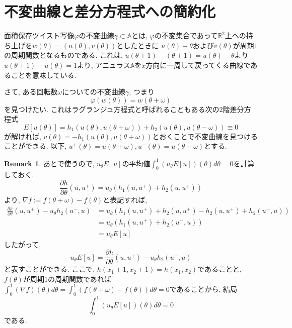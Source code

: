 \documentclass[a4paper]{ujarticle}
\numberwithin{equation}{section}
\theoremstyle{definition}
\newtheorem{remark}{Remark}
\begin{document}
    \section{不変曲線と差分方程式への簡約化}
        面積保存ツイスト写像$\varphi$の不変曲線$\gamma \subset \mathbb{A}$とは, 
        $\varphi$の不変集合であって$\mathbb{R}^2$上への持ち上げを$w(\theta) = (u(\theta), v(\theta))$としたときに
        $u(\theta) - \theta$および$v(\theta)$が周期$1$の周期関数となるものである.
        これは, $u(\theta + 1) - (\theta + 1) = u(\theta) - \theta$より$u(\theta + 1) - u(\theta) = 1$より, 
        アニュラス$\mathbb{A}$を$x$方向に一周して戻ってくる曲線であることを意味している.
        
        さて, ある回転数$\omega$についての不変曲線$\gamma$, つまり
        \[
                \varphi(w(\theta)) = w(\theta + \omega)
        \]
        を見つけたい. これはラグランジュ方程式と呼ばれることもある次の$2$階差分方程式
        \[
            E[u(\theta)] = h_1(u(\theta), u(\theta + \omega)) + h_2(u(\theta), u(\theta - \omega)) \equiv 0
        \]
        が解ければ, $v(\theta) = - h_1(u(\theta), u(\theta + \omega))$とおくことで不変曲線を見つけることができる.
        以下, $u^{+}(\theta) = u(\theta + \omega), u^{-}(\theta) = u(\theta - \omega)$とする.

        \begin{remark}
            あとで使うので, $u_{\theta} E[u]$の平均値$\displaystyle \int^{1}_{0} (u_{\theta} E[u])(\theta) d \theta = 0$を計算しておく.
            \[
                \frac{\partial h}{\partial \theta}(u, u^{+}) = u_{\theta} (h_1(u, u^{+}) + h_2(u, u^{+}))
            \]
            より, $\nabla f := f(\theta + \omega) - f(\theta)$と表記すれば,
            \begin{align}
                \frac{\partial h}{\partial \theta}(u, u^{+}) - u_{\theta} h_2(u^{-}, u)
                &= u_{\theta} (h_1(u, u^{+}) + h_2(u, u^{+}) - h_2(u, u^{+}) + h_2(u^{-}, u)) \\
                &= u_{\theta} (h_1(u, u^{+}) + h_2(u^{-}, u)) \\
                &= u_{\theta} E[u]
            \end{align}
            したがって, 
            \[
                u_{\theta} E[u] = \frac{\partial h}{\partial \theta}(u, u^{+}) - u_{\theta} h_2(u^{-}, u)
            \]
            と表すことができる.
            ここで, $h(x_1+1, x_2 + 1) = h(x_1, x_2)$であることと, 
            $f(\theta)$が周期$1$の周期関数であれば$\displaystyle \int^{1}_{0} (\nabla f)(\theta) d \theta = \int^{1}_{0} (f(\theta + \omega) - f(\theta)) d \theta = 0$であることから,
            結局
            \[
                \int^{1}_{0} (u_{\theta} E[u])(\theta) d \theta = 0
            \]
            である.

        \end{remark}
\end{document}
